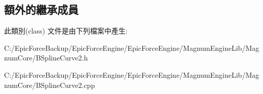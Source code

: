 \subsection*{額外的繼承成員}


此類別(class) 文件是由下列檔案中產生\+:\begin{DoxyCompactItemize}
\item 
C\+:/\+Epic\+Force\+Backup/\+Epic\+Force\+Engine/\+Epic\+Force\+Engine/\+Magnum\+Engine\+Lib/\+Magnum\+Core/B\+Spline\+Curve2.\+h\item 
C\+:/\+Epic\+Force\+Backup/\+Epic\+Force\+Engine/\+Epic\+Force\+Engine/\+Magnum\+Engine\+Lib/\+Magnum\+Core/B\+Spline\+Curve2.\+cpp\end{DoxyCompactItemize}
